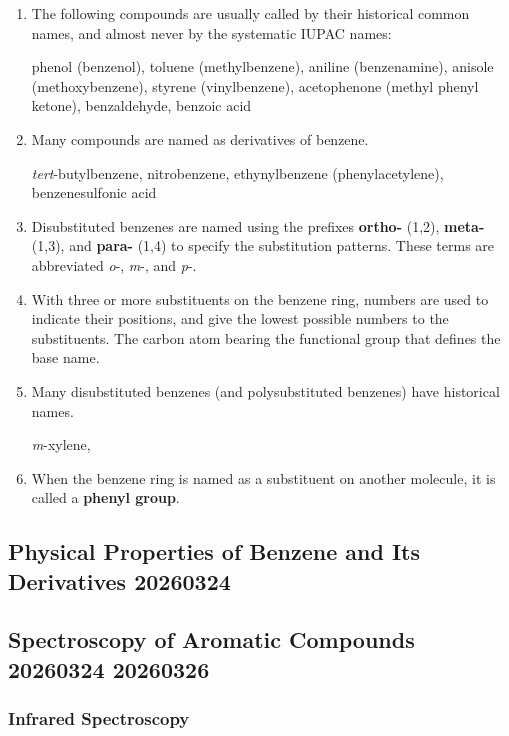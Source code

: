 \begin{enumerate}
    \item The following compounds are usually called by their historical common names, and almost never by the systematic IUPAC names:
    
    phenol (benzenol), toluene (methylbenzene), aniline (benzenamine), anisole (methoxybenzene), styrene (vinylbenzene), acetophenone (methyl phenyl ketone), benzaldehyde, benzoic acid 

    \item Many compounds are named as derivatives of benzene.

    \textit{tert}-butylbenzene, nitrobenzene, ethynylbenzene (phenylacetylene), benzenesulfonic acid

    \item Disubstituted benzenes are named using the prefixes \textbf{ortho-} (1,2), \textbf{meta-} (1,3), and \textbf{para-} (1,4) to specify the substitution patterns. These terms are abbreviated \textit{o}-, \textit{m}-, and \textit{p}-.
    
    \item With three or more substituents on the benzene ring, numbers are used to indicate their positions, and give the lowest possible numbers to the substituents. The carbon atom bearing the functional group that defines the base name.
    
    \item Many disubstituted benzenes (and polysubstituted benzenes) have historical names. 
    
    \textit{m}-xylene,

    \item When the benzene ring is named as a substituent on another molecule, it is called a \textbf{phenyl group}. 
\end{enumerate}

\subsection{Physical Properties of Benzene and Its Derivatives 20260324}

\subsection{Spectroscopy of Aromatic Compounds 20260324 20260326}

\subsubsection{Infrared Spectroscopy}

